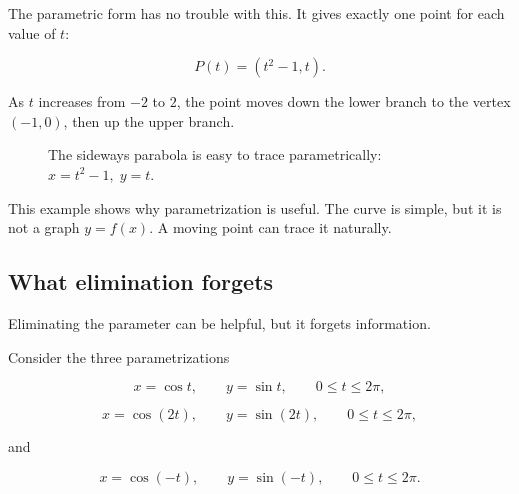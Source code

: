 The parametric form has no trouble with this.  It gives exactly one point for each
value of \(t\):

\[
P(t)=(t^2-1,t).
\]

As \(t\) increases from \(-2\) to \(2\), the point moves down the lower branch to the
vertex \((-1,0)\), then up the upper branch.

\begin{figure}[h]
\centering
{}
\caption{The sideways parabola is easy to trace parametrically: \(x=t^2-1,\;y=t\).}
\label{fig:sideways-parabola-parametric}
\end{figure}

This example shows why parametrization is useful.  The curve is simple, but it is not
a graph \(y=f(x)\).  A moving point can trace it naturally.

\subsection{What elimination forgets}
\label{subsec:what-elimination-forgets}

Eliminating the parameter can be helpful, but it forgets information.

Consider the three parametrizations

\[
x=\cos t,\qquad y=\sin t,\qquad 0\le t\le 2\pi,
\]

\[
x=\cos(2t),\qquad y=\sin(2t),\qquad 0\le t\le 2\pi,
\]

and

\[
x=\cos(-t),\qquad y=\sin(-t),\qquad 0\le t\le 2\pi.
\]

